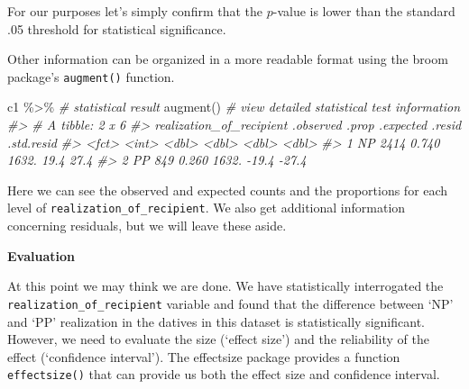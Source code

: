 \documentclass[
]{article}
\newenvironment{Shaded}{\begin{snugshade}}{\end{snugshade}}
\newcommand{\CommentTok}[1]{\textcolor[rgb]{0.56,0.35,0.01}{\textit{#1}}}
\newcommand{\FloatTok}[1]{\textcolor[rgb]{0.00,0.00,0.81}{#1}}
\newcommand{\FunctionTok}[1]{\textcolor[rgb]{0.00,0.00,0.00}{#1}}
\newcommand{\NormalTok}[1]{#1}
\newcommand{\SpecialCharTok}[1]{\textcolor[rgb]{0.00,0.00,0.00}{#1}}
\begin{document}
For our purposes let's simply confirm that the \(p\)-value is lower than the standard .05 threshold for statistical significance.

\begin{Shaded}
\end{Shaded}

Other information can be organized in a more readable format using the broom package's \texttt{augment()} function.

\begin{Shaded}
\begin{Highlighting}[]
\NormalTok{c1 }\SpecialCharTok{\%\textgreater{}\%} \CommentTok{\# statistical result}
  \FunctionTok{augment}\NormalTok{() }\CommentTok{\# view detailed statistical test information}
\CommentTok{\#\textgreater{} \# A tibble: 2 x 6}
\CommentTok{\#\textgreater{}   realization\_of\_recipient .observed .prop .expected .resid .std.resid}
\CommentTok{\#\textgreater{}   \textless{}fct\textgreater{}                        \textless{}int\textgreater{} \textless{}dbl\textgreater{}     \textless{}dbl\textgreater{}  \textless{}dbl\textgreater{}      \textless{}dbl\textgreater{}}
\CommentTok{\#\textgreater{} 1 NP                            2414 0.740     1632.   19.4       27.4}
\CommentTok{\#\textgreater{} 2 PP                             849 0.260     1632.  {-}19.4      {-}27.4}
\end{Highlighting}
\end{Shaded}

Here we can see the observed and expected counts and the proportions for each level of \texttt{realization\_of\_recipient}. We also get additional information concerning residuals, but we will leave these aside.

\textbf{Evaluation}

At this point we may think we are done. We have statistically interrogated the \texttt{realization\_of\_recipient} variable and found that the difference between `NP' and `PP' realization in the datives in this dataset is statistically significant. However, we need to evaluate the size (`effect size') and the reliability of the effect (`confidence interval'). The effectsize package provides a function \texttt{effectsize()} that can provide us both the effect size and confidence interval.
\end{document}
